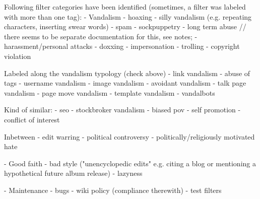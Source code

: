 \begin{comment}
    \item how often were (which) filters triggered: see \url{filter-lists/20190106115600_filters-sorted-by-hits.csv} and~\ref{tab:most-active-actions}; see also jupyter notebook for aggregated hitcounts over tagged categories
    \item percentage filters of different types over the years: according to actions (I need a complete abuse\_filter\_log table for this!); according to self-assigned tags %
\end{comment}

Following filter categories have been identified (sometimes, a filter was labeled with more than one tag):
- Vandalism
  - hoaxing
  - silly vandalism (e.g. repeating characters, inserting swear words)
  - spam
  - sockpuppetry
  - long term abuse // there seems to be separate documentation for this, see notes;
  - harassment/personal attacks
    - doxxing
    - impersonation
  - trolling
  - copyright violation

  Labeled along the vandalism typology (check above)
  - link vandalism
  - abuse of tags
  - username vandalism
  - image vandalism
  - avoidant vandalism
  - talk page vandalism
  - page move vandalism
  - template vandalism
  - vandalbots

  Kind of similar:
  - seo
  - stockbroker vandalism
  - biased pov
  - self promotion
  - conflict of interest

Inbetween
- edit warring
- political controversy
- politically/religiously motivated hate

- Good faith
  - bad style ("unencyclopedic edits" e.g. citing a blog or mentioning a hypothetical future album release)
  - lazyness


- Maintenance
  - bugs
  - wiki policy (compliance therewith)
  - test filters

